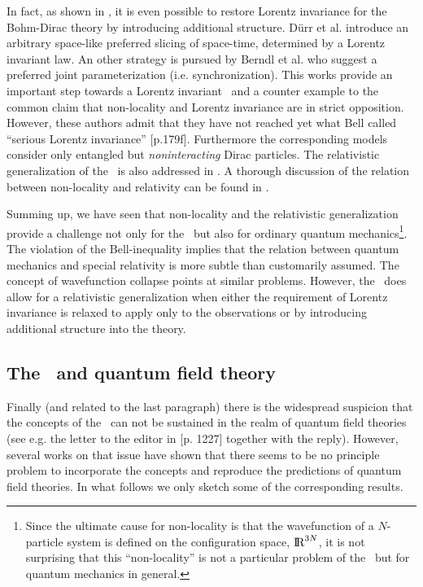 In fact, as shown in \cite{detal}, it is even possible to restore Lorentz invariance for the Bohm-Dirac theory by introducing 
additional structure. D\"urr et al. introduce an arbitrary space-like preferred slicing of space-time, determined by a Lorentz 
invariant law. An other strategy is pursued by Berndl et al. \cite{rela} who suggest a preferred joint parameterization 
(i.e. synchronization). This works provide an important step towards a Lorentz invariant \dbb\ and a counter 
example to the common 
claim that non-locality and Lorentz invariance are in strict opposition. However, these authors admit that they have not reached yet what 
Bell called ``serious Lorentz invariance'' \cite{speakable}[p.179f]. Furthermore the corresponding models  consider only entangled but 
{\em noninteracting} Dirac particles.
The relativistic generalization of the \dbb\ is also addressed in \cite{chris,GoTu03,squires}. A thorough discussion of the relation 
between non-locality and relativity can be found in \cite{dickson}.

Summing up, we have seen that non-locality and the relativistic generalization provide a challenge not only for the \dbb\ but 
also for ordinary quantum mechanics\footnote{Since the ultimate cause for non-locality is that the wavefunction of a $N$-particle 
system is defined on the configuration space, ${\rm I\!R}^{3N}$, it is not surprising that this ``non-locality'' is not a 
particular problem of the \dbb\ but for quantum mechanics in general.}. The violation of the Bell-inequality implies that the 
relation between quantum mechanics and special relativity is more subtle than customarily assumed. The concept of wavefunction 
collapse points at similar problems. 
 However, the \dbb\ does allow for a relativistic generalization when either the requirement of Lorentz invariance is relaxed 
to apply only to the observations or by introducing additional structure into the theory.

\subsection{The \dbb\ and quantum field theory}

Finally (and related to the last paragraph) there is the widespread suspicion that the concepts of the \dbb\ can not be sustained in
the realm of quantum field theories (see e.g. the letter to the editor in \cite{lte}[p. 1227] together with the reply).
However, several works on that issue have shown that there seems to be no principle problem to 
incorporate the concepts and reproduce the predictions of quantum field theories. In what follows we only sketch some of the corresponding
results. 

